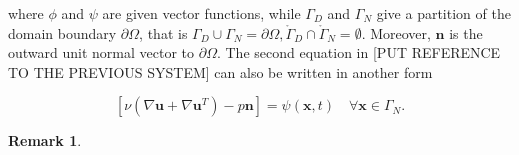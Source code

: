 \documentclass[11pt,a4paper,titlepage]{report}
\newtheorem*{remark}{Remark}
\begin{document}
where $\phi$ and $\psi$ are given vector functions, while $\Gamma_D$ and $\Gamma_N$ give a partition of the domain boundary $\partial \Omega$, that is $\Gamma_D 	\cup \Gamma_N = \partial \Omega, \mathring{\Gamma}_D \cap \mathring{\Gamma}_N = \emptyset$. Moreover, $\mathbf{n}$ is the outward unit normal vector to $\partial \Omega$. The second equation in [PUT REFERENCE TO THE PREVIOUS SYSTEM] can also be written in another form

\[
[ \nu (\nabla \mathbf{u} + \nabla \mathbf{u}^T)  - p\mathbf{n} ] = \psi(\mathbf{x}, t)  \quad \forall \mathbf{x} \in \Gamma_N.
\]

\begin{remark}
\end{remark}


%
%
%
%
%
\end{document}
